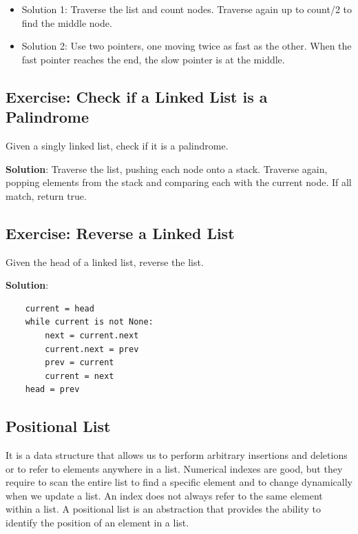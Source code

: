     \begin{itemize}
        \item Solution 1: Traverse the list and count nodes. Traverse again up to count/2 to find the middle node.
        \item Solution 2: Use two pointers, one moving twice as fast as the other. When the fast pointer reaches the end, the slow pointer is at the middle.
    \end{itemize}
    
    \subsection{Exercise: Check if a Linked List is a Palindrome}
    Given a singly linked list, check if it is a palindrome.
    
    \textbf{Solution}: Traverse the list, pushing each node onto a stack. Traverse again, popping elements from the stack and comparing each with the current node. If all match, return true.
    
    \subsection{Exercise: Reverse a Linked List}
    Given the head of a linked list, reverse the list.
    
    \textbf{Solution}:
    \begin{verbatim}
    current = head
    while current is not None:
        next = current.next
        current.next = prev
        prev = current
        current = next
    head = prev
    \end{verbatim}
    
    \subsection{Positional List}
    It is a data structure that allows us to perform arbitrary insertions and deletions or to refer to elements anywhere in a list. Numerical indexes are good, but they require to scan the entire list to find a specific element and to change dynamically when we update a list. An index does not always refer to the same element within a list. A positional list is an abstraction that provides the ability to identify the position of an element in a list.
    

    
